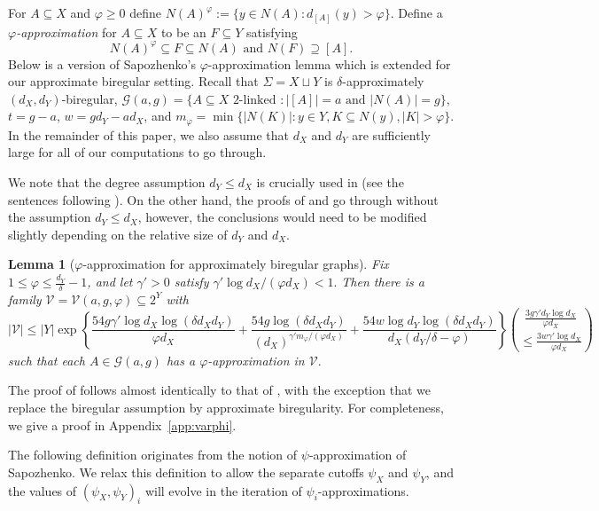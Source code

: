 \documentclass[a4paper]{amsart}
\newtheorem{lem}[thm]{Lemma}
\theoremstyle{definition}
\newcommand{\cG}{\mathcal{G} }
\newcommand{\cV}{\mathcal{V} }
\newcommand{\beq}[1]{\begin{equation}\label{#1}}
\newcommand{\enq}[0]{\end{equation}}
\newcommand{\gd}[0]{\delta }
\newcommand{\nin}[0]{\noindent}
\newcommand{\sub}[0]{\subseteq}
\newcommand{\0}[0]{\emptyset}
\begin{document}
For $A \sub X$ and $\varphi\geq 0$ define $N(A)^\varphi:=\{y \in N(A):d_{[A]}(y)>\varphi\}$. Define a \textit{$\varphi$-approximation} for $A \sub X$ to be an $F \sub Y$ satisfying 
    \[N(A)^\varphi \sub F \sub N(A) \text{ and } N(F) \supseteq [A].\]
Below is a version of Sapozhenko's $\varphi$-approximation lemma which is extended for our approximate biregular setting. Recall that $\Sigma=X \sqcup Y$ is $\gd$-approximately $(d_X, d_Y)$-biregular, $\cG(a,g)=\{A \subseteq X \text{ 2-linked }: |[A]|=a \text{ and } |N(A)|=g\}$, 
$t=g-a$, $w=gd_Y-ad_X$, and $m_\varphi=\min\{|N(K)|: y \in Y, K \sub N(y), |K| >\varphi\}.$ In the remainder of this paper, we also assume that $d_X$ and $d_Y$ are sufficiently large for all of our computations to go through. 

We note that the degree assumption $d_Y \le d_X$ is crucially used in  (see the sentences following ). On the other hand, the proofs of  and  go through without the assumption $d_Y \le d_X$, however, the conclusions would need to be modified slightly depending on the relative size of $d_Y$ and $d_X$.

\begin{lem}[$\varphi$-approximation for approximately biregular graphs]\label{lem.varphi} Fix $1 \le \varphi \le \frac{d_Y}{\gd}-1$, and let $\gamma'>0$ satisfy $\gamma'\log d_X/(\varphi d_X)<1.$ 
Then there is a family $\cV=\cV(a,g,\varphi) \sub 2^Y$ with
\beq{varphi_bd}|\cV|\le |Y|\exp\left\{\frac{54g\gamma'\log d_X \log (\delta d_Xd_Y)}{\varphi d_X}+\frac{54g\log (\delta d_Xd_Y)}{(d_X)^{\gamma'm_\varphi/(\varphi d_X)}}+\frac{54w\log d_Y \log (\delta d_Xd_Y)}{d_X(d_Y/\gd-\varphi)}\right\}{\frac{3g\gamma'd_Y\log d_X}{\varphi d_X}\choose \le \frac{3w\gamma'\log d_X}{\varphi d_X}}\enq
such that each $A \in \cG(a,g)$ has a $\varphi$-approximation in $\cV.$    
\end{lem}

\nin The proof of  follows almost identically to that of \cite[Lemma A.3]{BalGLW21}, with the exception that we replace the biregular assumption by approximate biregularity. For completeness, we give a proof in Appendix~\ref{app:varphi}. 

The following definition originates from the notion of $\psi$-approximation of Sapozhenko. We relax this definition to allow the separate cutoffs $\psi_X$ and $\psi_Y$, and the values of $(\psi_X, \psi_Y)_i$ will evolve in the iteration of $\psi_i$-approximations.
\end{document}
